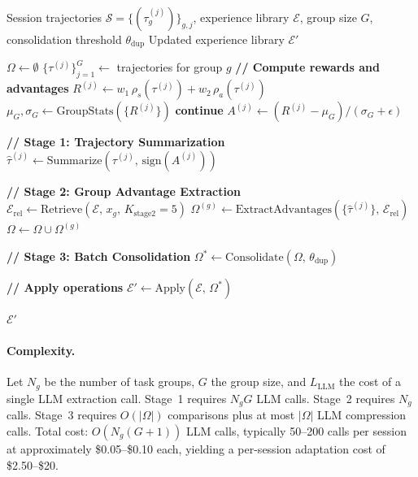 \documentclass[11pt]{article}
\begin{document}
\begin{algorithm}[H]
\caption{AGENT-GRPO: Agent-Level Training-Free GRPO}
\label{alg:agent-grpo}
\begin{algorithmic}[1]
\Require Session trajectories $\mathcal{S} = \{(\tau^{(j)}_g)\}_{g,j}$,
         experience library $\mathcal{E}$,
         group size $G$, consolidation threshold $\theta_{\text{dup}}$
\Ensure Updated experience library $\mathcal{E}'$

\State $\Omega \gets \emptyset$ 
    \State $\{\tau^{(j)}\}_{j=1}^G \gets$ trajectories for group $g$
    \State \textbf{// Compute rewards and advantages}
        \State $R^{(j)} \gets w_1\,\rho_s(\tau^{(j)}) + w_2\,\rho_a(\tau^{(j)})$
    \EndFor
    \State $\mu_G, \sigma_G \gets \text{GroupStats}(\{R^{(j)}\})$
        \State \textbf{continue} 
    \EndIf
        \State $A^{(j)} \gets (R^{(j)} - \mu_G) / (\sigma_G + \epsilon)$
    \EndFor

    \State \textbf{// Stage 1: Trajectory Summarization}
        \State $\hat{\tau}^{(j)} \gets \text{Summarize}(\tau^{(j)},\, \text{sign}(A^{(j)}))$
    \EndFor

    \State \textbf{// Stage 2: Group Advantage Extraction}
    \State $\mathcal{E}_{\text{rel}} \gets \text{Retrieve}(\mathcal{E},\, x_g,\, K_{\text{stage2}}=5)$
    \State $\Omega^{(g)} \gets \text{ExtractAdvantages}(\{\hat{\tau}^{(j)}\},\, \mathcal{E}_{\text{rel}})$
    \State $\Omega \gets \Omega \cup \Omega^{(g)}$
\EndFor

\State \textbf{// Stage 3: Batch Consolidation}
\State $\Omega^* \gets \text{Consolidate}(\Omega,\, \theta_{\text{dup}})$

\State \textbf{// Apply operations}
\State $\mathcal{E}' \gets \text{Apply}(\mathcal{E},\, \Omega^*)$

\State \Return $\mathcal{E}'$
\end{algorithmic}
\end{algorithm}

\paragraph{Complexity.}
Let $N_g$ be the number of task groups, $G$ the group size, and $L_{\text{LLM}}$
the cost of a single LLM extraction call. Stage~1 requires $N_g G$ LLM calls.
Stage~2 requires $N_g$ calls. Stage~3 requires $O(|\Omega|)$ comparisons plus
at most $|\Omega|$ LLM compression calls. Total cost: $O(N_g(G + 1))$ LLM
calls, typically 50--200 calls per session at approximately \$0.05--\$0.10
each, yielding a per-session adaptation cost of \$2.50--\$20.
\end{document}
